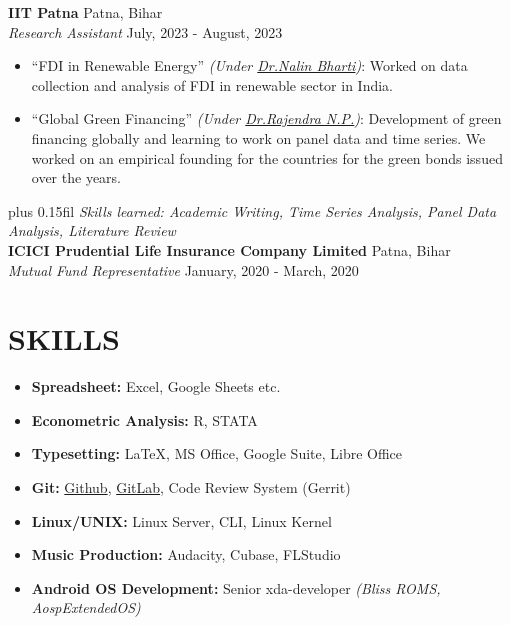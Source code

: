 \documentclass[a4paper,9pt]{extarticle}
\begin{document}
	\noindent
	\textbf{IIT Patna} \hfill Patna, Bihar\\ %
	\textit{Research Assistant} \hfill July, 2023 - August, 2023 %
	\begin{itemize} %
		\item \enquote{FDI in Renewable Energy} \textit{(Under \href{https://www.linkedin.com/in/nalin-bharti-439b3815/}{Dr.Nalin Bharti})}: Worked on data collection and analysis of FDI in renewable sector in India.  
		\item \enquote{Global Green Financing} \textit{(Under \href{https://www.linkedin.com/in/rajendra-paramanik-8709453b/}{Dr.Rajendra N.P.})}: Development of green financing globally and learning to work on panel data and time series. We worked on an empirical founding for the countries for the green bonds issued over the years.
	\end{itemize}
\vspace{-5pt}
\leftskip=0pt plus 0.15fil %
\textit{Skills learned: Academic Writing, Time Series Analysis, Panel Data Analysis, Literature Review}\\
	\vspace{7pt}
	\noindent
	\textbf{ICICI Prudential Life Insurance Company Limited} \hfill Patna, Bihar \\ %
	\textit{Mutual Fund Representative} \hfill January, 2020 - March, 2020 %

	\section*{SKILLS}
	\begin{itemize}
		\item \textbf{Spreadsheet:} Excel, Google Sheets etc.
		\item \textbf{Econometric Analysis:} R, STATA
		\item \textbf{Typesetting: } \LaTeX, MS Office, Google Suite, Libre Office
		\item \textbf{Git:} \href{https://github.com/AmolAmrit}{Github}, \href{https://gitlab.com/AmolAmrit}{GitLab}, Code Review System (Gerrit)
		\item \textbf{Linux/UNIX:} Linux Server, CLI, Linux Kernel
		\item \textbf{Music Production: } Audacity, Cubase, FLStudio
		\item \textbf{Android OS Development:} Senior xda-developer \textit{(Bliss ROMS, AospExtendedOS)}
	\end{itemize}
	
\end{document}
